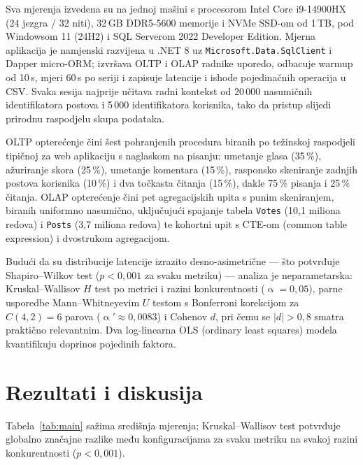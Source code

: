 \documentclass[10pt,conference,a4paper]{IEEEtran}
\begin{document}
Sva mjerenja izvedena su na jednoj mašini s procesorom Intel Core i9-14900HX
(24 jezgra / 32 niti), 32\,GB DDR5-5600 memorije i NVMe SSD-om od 1\,TB, pod
Windowsom 11 (24H2) i SQL Serverom 2022 Developer Edition.
Mjerna aplikacija je namjenski razvijena u .NET 8 uz
\texttt{Microsoft.Data.SqlClient} i Dapper micro-ORM; izvršava OLTP i OLAP
radnike uporedo, odbacuje warmup od 10\,s, mjeri 60\,s po seriji i
zapisuje latencije i ishode pojedinačnih operacija u CSV. Svaka sesija
najprije učitava radni kontekst od 20\,000 nasumičnih identifikatora postova
i 5\,000 identifikatora korisnika, tako da pristup slijedi prirodnu
raspodjelu skupa podataka.

OLTP opterećenje čini šest pohranjenih procedura biranih po težinskoj
raspodjeli tipičnoj za web aplikaciju s naglaskom na pisanju: umetanje glasa
(35\,\%), ažuriranje skora (25\,\%), umetanje komentara (15\,\%), rasponsko
skeniranje zadnjih postova korisnika (10\,\%) i dva točkasta čitanja
(15\,\%), dakle 75\,\% pisanja i 25\,\% čitanja. OLAP opterećenje
čini pet agregacijskih upita s punim skeniranjem, biranih uniformno
nasumično, uključujući spajanje tabela \texttt{Votes} (10,1 miliona redova)
i \texttt{Posts} (3,7 miliona redova) te kohortni upit s CTE-om (common table
expression) i dvostrukom agregacijom.

Budući da su distribucije latencije izrazito desno-asimetrične --- što
potvrđuje Shapiro--Wilkov test ($p < 0{,}001$ za svaku metriku) --- analiza
je neparametarska: Kruskal--Wallisov $H$ test po metrici i razini
konkurentnosti ($\upalpha = 0{,}05$), parne usporedbe Mann--Whitneyevim $U$
testom s Bonferroni korekcijom za $C(4,2) = 6$ parova
($\upalpha' \approx 0{,}0083$) i Cohenov $d$, pri čemu se $|d| > 0{,}8$ smatra
praktično relevantnim. Dva log-linearna OLS (ordinary least
squares) modela kvantifikuju doprinos pojedinih faktora.

\section{Rezultati i diskusija}
Tabela~\ref{tab:main} sažima središnja mjerenja; Kruskal--Wallisov test
potvrđuje globalno značajne razlike među konfiguracijama za svaku metriku na
svakoj razini konkurentnosti ($p < 0{,}001$).
\end{document}
